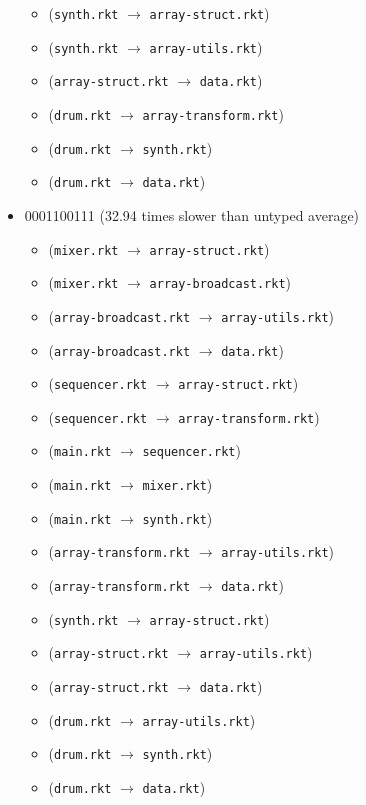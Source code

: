 \documentclass{article}
\newcommand{\mono}[1]{\texttt{#1}}
\begin{document}
\begin{itemize}
\begin{itemize}
  \item (\mono{synth.rkt} $\rightarrow$ \mono{array-struct.rkt})
  \item (\mono{synth.rkt} $\rightarrow$ \mono{array-utils.rkt})
  \item (\mono{array-struct.rkt} $\rightarrow$ \mono{data.rkt})
  \item (\mono{drum.rkt} $\rightarrow$ \mono{array-transform.rkt})
  \item (\mono{drum.rkt} $\rightarrow$ \mono{synth.rkt})
  \item (\mono{drum.rkt} $\rightarrow$ \mono{data.rkt})
  \end{itemize}
\item 0001100111 (32.94 times slower than untyped average)
  \begin{itemize}
  \item (\mono{mixer.rkt} $\rightarrow$ \mono{array-struct.rkt})
  \item (\mono{mixer.rkt} $\rightarrow$ \mono{array-broadcast.rkt})
  \item (\mono{array-broadcast.rkt} $\rightarrow$ \mono{array-utils.rkt})
  \item (\mono{array-broadcast.rkt} $\rightarrow$ \mono{data.rkt})
  \item (\mono{sequencer.rkt} $\rightarrow$ \mono{array-struct.rkt})
  \item (\mono{sequencer.rkt} $\rightarrow$ \mono{array-transform.rkt})
  \item (\mono{main.rkt} $\rightarrow$ \mono{sequencer.rkt})
  \item (\mono{main.rkt} $\rightarrow$ \mono{mixer.rkt})
  \item (\mono{main.rkt} $\rightarrow$ \mono{synth.rkt})
  \item (\mono{array-transform.rkt} $\rightarrow$ \mono{array-utils.rkt})
  \item (\mono{array-transform.rkt} $\rightarrow$ \mono{data.rkt})
  \item (\mono{synth.rkt} $\rightarrow$ \mono{array-struct.rkt})
  \item (\mono{array-struct.rkt} $\rightarrow$ \mono{array-utils.rkt})
  \item (\mono{array-struct.rkt} $\rightarrow$ \mono{data.rkt})
  \item (\mono{drum.rkt} $\rightarrow$ \mono{array-utils.rkt})
  \item (\mono{drum.rkt} $\rightarrow$ \mono{synth.rkt})
  \item (\mono{drum.rkt} $\rightarrow$ \mono{data.rkt})
  \end{itemize}


\end{itemize}
\end{document}
